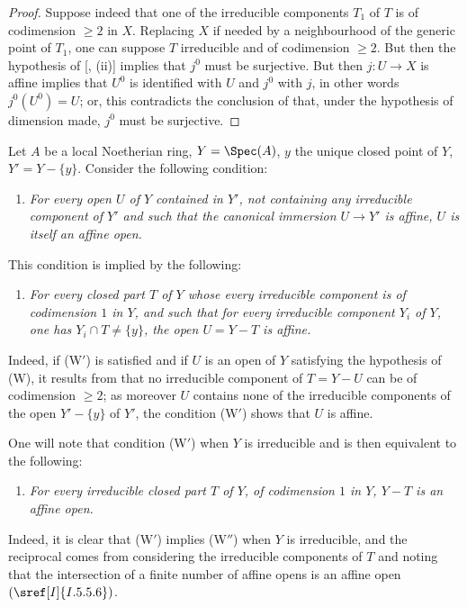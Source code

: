 \begin{proof}
Suppose indeed that one of the irreducible components $T_1$ of $T$ is of codimension $\geq 2$ in $X$.
Replacing $X$ if needed by a neighbourhood of the generic point of $T_1$, one can suppose $T$ irreducible and of codimension $\geq 2$.
But then the hypothesis of [, (ii)] implies that $j^0$ must be surjective.
But then $j:U\to X$ is affine implies that $U^0$ is identified with $U$ and $j^0$ with $j$, in other words $j^0(U^0)=U$;
or, this contradicts the conclusion of  that, under the hypothesis of dimension made, $j^0$ must be surjective.
\end{proof}


\begin{env}[21.12.8]
\label{IV.21.12.8}
Let $A$ be a local Noetherian ring, $Y=\Spec(A)$, $y$ the unique closed point of $Y$, $Y'=Y-\{y\}$.
Consider the following condition:
\begin{enumerate}
  \item[\textbf{(W)}] \emph{For every open $U$ of $Y$ contained in $Y'$, not containing any irreducible component of $Y'$ and such that the canonical immersion $U\to Y'$ is affine, $U$ is itself an affine open.}
\end{enumerate}

This condition is implied by the following:
\begin{enumerate}
  \item[\textbf{(W$'$)}] \emph{For every closed part $T$ of $Y$ whose every irreducible component is of codimension $1$ in $Y$, and such that for every irreducible component $Y_i$ of $Y$, one has $Y_i\cap T\neq\{y\}$, the open $U=Y-T$ is affine.}
\end{enumerate}

Indeed, if (W$'$) is satisfied and if $U$ is an open of $Y$ satisfying the hypothesis of (W), it results from  that no irreducible component of $T=Y-U$ can be of codimension $\geq 2$;
as moreover $U$ contains none of the irreducible components of the open $Y'-\{y\}$ of $Y'$, the condition (W$'$) shows that $U$ is affine.

One will note that condition (W$'$) when $Y$ is irreducible and is then equivalent to the following:
\begin{enumerate}
  \item[\textbf{(W$''$)}] \emph{For every irreducible closed part $T$ of $Y$, of codimension $1$ in $Y$, $Y-T$ is an affine open.}
\end{enumerate}

Indeed, it is clear that (W$'$) implies (W$''$) when $Y$ is irreducible, and the reciprocal comes from considering the irreducible components of $T$ and noting that the intersection of a finite number of affine opens is an affine open $(\sref[I]{I.5.5.6})$.
\end{env}

